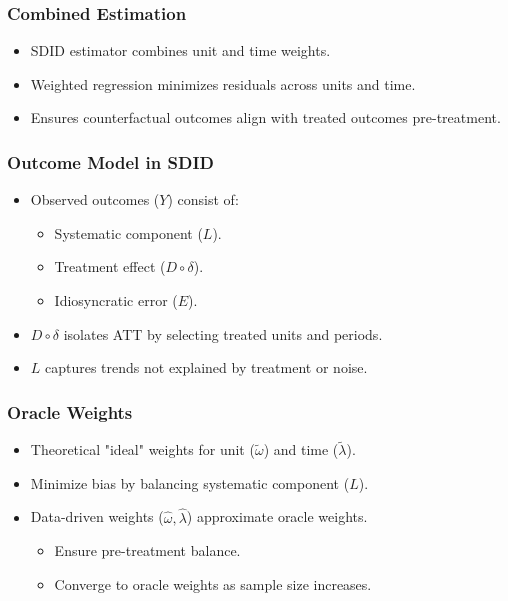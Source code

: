 \documentclass{beamer}
\begin{document}
\begin{frame}
\frametitle{Combined Estimation}

\begin{itemize}
    \item SDID estimator combines unit and time weights.
    \item Weighted regression minimizes residuals across units and time.
    \item Ensures counterfactual outcomes align with treated outcomes pre-treatment.
\end{itemize}

\end{frame}




\begin{frame}
\frametitle{Outcome Model in SDID}

\begin{itemize}
    \item Observed outcomes (\(Y\)) consist of:
        \begin{itemize}
            \item Systematic component (\(L\)).
            \item Treatment effect (\(D \circ \delta\)).
            \item Idiosyncratic error (\(E\)).
        \end{itemize}
    \item \(D \circ \delta\) isolates ATT by selecting treated units and periods.
    \item \(L\) captures trends not explained by treatment or noise.
\end{itemize}

\end{frame}




\begin{frame}
\frametitle{Oracle Weights}

\begin{itemize}
    \item Theoretical "ideal" weights for unit (\(\tilde{\omega}\)) and time (\(\tilde{\lambda}\)).
    \item Minimize bias by balancing systematic component (\(L\)).
    \item Data-driven weights (\(\hat{\omega}, \hat{\lambda}\)) approximate oracle weights.
        \begin{itemize}
            \item Ensure pre-treatment balance.
            \item Converge to oracle weights as sample size increases.
        \end{itemize}
\end{itemize}

\end{frame}
\end{document}
